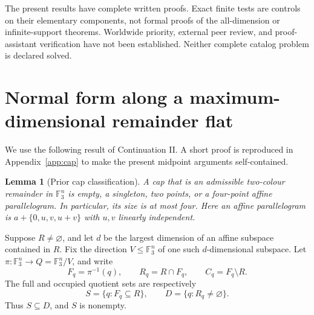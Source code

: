 \documentclass[11pt]{article}
\newtheorem{lemma}[theorem]{Lemma}
\theoremstyle{remark}\newtheorem{remark}[theorem]{Remark}
\newcommand{\F}{\mathbb F_3}
\begin{document}
The present results have complete written proofs. Exact finite tests are
controls on their elementary components, not formal proofs of the
all-dimension or infinite-support theorems. Worldwide priority, external
peer review, and proof-assistant verification have not been established.
Neither complete catalog problem is declared solved.

\section{Normal form along a maximum-dimensional remainder flat}

We use the following result of Continuation II. A short proof is reproduced
in Appendix~\ref{app:cap} to make the present midpoint arguments self-contained.

\begin{lemma}[Prior cap classification]\label{lem:cap}
A cap that is an admissible two-colour remainder in $\F^n$ is empty, a
singleton, two points, or a four-point affine parallelogram. In particular,
its size is at most four. Here an affine parallelogram is
$a+\{0,u,v,u+v\}$ with $u,v$ linearly independent.
\end{lemma}

Suppose $R\ne\varnothing$, and let $d$ be the largest dimension of an affine
subspace contained in $R$. Fix the direction $V\leq\F^n$ of one such
$d$-dimensional subspace. Let $\pi:\F^n\to Q=\F^n/V$, and write
\[
 F_q=\pi^{-1}(q),\qquad R_q=R\cap F_q,\qquad C_q=F_q\setminus R.
\]
The full and occupied quotient sets are respectively
\[
 S=\{q:F_q\subseteq R\},\qquad D=\{q:R_q\ne\varnothing\}.
\]
Thus $S\subseteq D$, and $S$ is nonempty.
\end{document}
